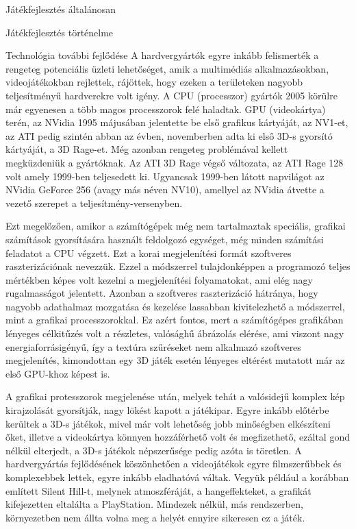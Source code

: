 \begin{MyChapter}{Játékfejlesztés általánosan}
\begin{MySection}{Játékfejlesztés történelme}
		\begin{MySubSection}{Technológia további fejlődése}
			A hardvergyártók egyre inkább felismerték a rengeteg potenciális üzleti lehetőséget, amik a multimédiás alkalmazásokban, videojátékokban rejlettek, rájöttek, hogy ezeken a területeken nagyobb teljesítményű hardverekre volt igény.
			A CPU (processzor) gyártók 2005 körülre már egyenesen a több magos processzorok felé haladtak. 
			GPU (videokártya) terén, az NVidia 1995 májusában jelentette be első grafikus kártyáját, az NV1-et, az ATI pedig szintén abban az évben, novemberben adta ki első 3D-s gyorsító kártyáját, a 3D Rage-et. Még azonban rengeteg problémával kellett megküzdeniük a gyártóknak. Az ATI 3D Rage végső változata, az ATI Rage 128 volt amely 1999-ben teljesedett ki. Ugyancsak 1999-ben látott napvilágot az NVidia GeForce 256 (avagy más néven NV10), amellyel az NVidia átvette a vezető szerepet a teljesítmény-versenyben.
		
			Ezt megelőzően, amikor a számítógépek még nem tartalmaztak speciális, grafikai számítások gyorsítására használt feldolgozó egységet, még minden számítási feladatot a CPU végzett. Ezt a korai megjelenítési formát szoftveres raszterizációnak nevezzük. Ezzel a módszerrel tulajdonképpen a programozó teljes mértékben képes volt kezelni a megjelenítési folyamatokat, ami elég nagy rugalmasságot jelentett.
			Azonban a szoftveres raszterizáció hátránya, hogy nagyobb adathalmaz mozgatása és kezelése lassabban kivitelezhető a módszerrel, mint a grafikai processzorokkal.
			Ez azért fontos, mert a számítógépes grafikában lényeges célkitűzés volt a részletes, valósághű ábrázolás elérése, ami viszont nagy energiaforrásigényű, így a textúra szűréseket nem alkalmazó szoftveres megjelenítés, kimondottan egy 3D játék esetén lényeges eltérést mutatott már az első GPU-khoz képest is. \cite{mileff}
		
			A grafikai protesszorok megjelenése után, melyek tehát a valósidejű komplex kép kirajzolását gyorsítják, nagy lökést kapott a játékipar. Egyre inkább előtérbe kerültek a 3D-s játékok, mivel már volt lehetőség jobb minőségben elkészíteni őket, illetve a videokártya könnyen hozzáférhető volt és megfizethető, ezáltal gond nélkül elterjedt, a 3D-s játékok népszerűsége pedig azóta is töretlen.
			A hardvergyártás fejlődésének köszönhetően a videojátékok egyre filmszerűbbek és komplexebbek lettek, egyre inkább eladhatóvá váltak. Vegyük például a korábban említett Silent Hill-t, melynek atmoszféráját, a hangeffekteket, a grafikát kifejezetten eltalálta a PlayStation. Mindezek nélkül, más rendszerben, környezetben nem állta volna meg a helyét ennyire sikeresen ez a játék.
		

\end{MySubSection}
\end{MySection}
\end{MyChapter}

